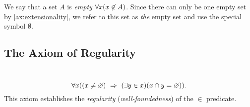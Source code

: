 \begin{definition}
    We say that a set $A$ is \emph{empty} \iffbydefn $\forall x \pn*{x \not \in A}$.
    Since there can only be one empty set by \autoref{ax:extensionality},
    we refer to this set as \emph{the} empty set and use the special symbol $\emptyset$.
\end{definition}

\subsection{The Axiom of Regularity}
\begin{axiom}[Regularity]\label{ax:regularity}
    ~\vspace{-\baselineskip}
    \[
        \forall x \pn*{\pn*{x \neq \emptyset} \implies \pn*{\exists y \in x}\pn*{x \intersect y = \emptyset}}.
    \]
    This axiom establishes the \emph{regularity} (\aka \emph{well-foundedness}) of the $\in$ predicate.
\end{axiom}

